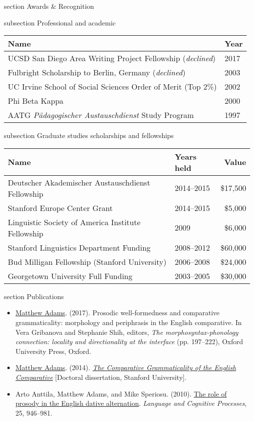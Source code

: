 \documentclass[10pt]{article}
\newcommand{\sectionhead}[1]{%
\begin{bgbox}{section}%
{\Large \textsf{#1}}%
\end{bgbox}%
}
\newcommand{\subsectionhead}[1]{%
\begin{bgbox}{subsection}%
{\small \textsf{#1}}%
\end{bgbox}%
}
\begin{document}
\newpage
\sectionhead{Awards \& Recognition}
\label{Awards}
\subsectionhead{Professional and academic}
\label{sec:org04dc472}

\begin{center}
\begin{tabular}{ll}
\hline
\textbf{Name} & \textbf{Year}\\
\hline
UCSD San Diego Area Writing Project Fellowship (\emph{declined}) & 2017\\
Fulbright Scholarship to Berlin, Germany (\emph{declined}) & 2003\\
UC Irvine School of Social Sciences Order of Merit (Top 2\%) & 2002\\
Phi Beta Kappa & 2000\\
AATG \emph{Pädagogischer Austauschdienst} Study Program & 1997\\
\hline
\end{tabular}
\end{center}

\subsectionhead{Graduate studies scholarships and fellowships}
\label{Graduate-studies-scholarships-and-fellowships}
\begin{center}
\begin{tabular}{llr}
\hline
\textbf{Name} & \textbf{Years held} & \textbf{Value}\\
\hline
Deutscher Akademischer Austauschdienst Fellowship & 2014--2015 & \$17,500\\
Stanford Europe Center Grant & 2014--2015 & \$5,000\\
Linguistic Society of America Institute Fellowship & 2009 & \$6,000\\
Stanford Linguistics Department Funding & 2008--2012 & \$60,000\\
Bud Milligan Fellowship (Stanford University) & 2006--2008 & \$24,000\\
Georgetown University Full Funding & 2003--2005 & \$30,000\\
\hline
\end{tabular}
\end{center}
\sectionhead{Publications}
\label{Publications}
\small

\begin{itemize}
\item \href{https://scholar.google.com/citations?user=-k9s2XwAAAAJ\&hl=en}{Matthew Adams}. (2017). Prosodic well-formedness and comparative grammaticality: morphology and periphrasis in the English comparative. In Vera Gribanova and Stephanie Shih, editors, \emph{The morphosyntax-phonology connection: locality and directionality at the interface} (pp. 197--222), Oxford University Press, Oxford.
\item \href{https://scholar.google.com/citations?user=-k9s2XwAAAAJ\&hl=en}{Matthew Adams}. (2014). \emph{\href{https://searchworks.stanford.edu/view/10530947}{The Comparative Grammaticality of the English Comparative}} [Doctoral dissertation, Stanford University].
\item Arto Anttila, Matthew Adams, and Mike Speriosu. (2010). \href{http://www.tandfonline.com/doi/full/10.1080/01690960903525481}{The role of prosody in the English dative alternation}. \emph{Language and Cognitive Processes}, 25, 946--981.
\end{itemize}
\end{document}
